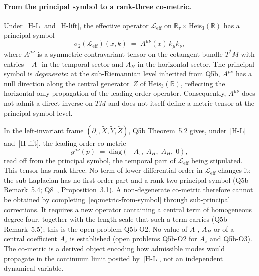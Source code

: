 \documentclass[11pt,a4paper]{article}
\begin{document}
    \paragraph{From the principal symbol to a rank-three co-metric.}
      \label{par:cometric-metric}
      Under~[H-L] and~[H-lift], the effective operator $\mathcal{L}_{\mathrm{eff}}$ on
      $\mathbb{R}_\tau \times \mathrm{Heis}_3(\mathbb{R})$ has a principal symbol
      \begin{equation}
        \label{eq:principal-symbol}
        \sigma_2(\mathcal{L}_{\mathrm{eff}})(x, k) \;=\; A^{\mu\nu}(x)\,k_\mu k_\nu,
      \end{equation}
      where $A^{\mu\nu}$ is a symmetric contravariant tensor on the cotangent bundle $T^*M$ with entries $-A_\tau$ in
      the temporal sector and $A_H$ in the horizontal sector.
      The principal symbol is \emph{degenerate}: at the sub-Riemannian level inherited from Q5b, $A^{\mu\nu}$ has a
      null direction along the central generator~$Z$ of $\mathrm{Heis}_3(\mathbb{R})$, reflecting the horizontal-only
      propagation of the leading-order operator.
      Consequently, $A^{\mu\nu}$ does not admit a direct inverse on $TM$ and does not itself define a metric tensor
      at the principal-symbol level.

      In the left-invariant frame $(\partial_\tau, \widetilde{X}, \widetilde{Y}, \widetilde{Z})$, Q5b Theorem~5.2
      gives, under~[H-L] and~[H-lift], the leading-order co-metric
      \begin{equation}
        \label{eq:metric-from-symbol}
        g^{\mu\nu}(p) \;=\; \mathrm{diag}(-A_\tau,\; A_H,\; A_H,\; 0),
      \end{equation}
      read off from the principal symbol, the temporal part of $\mathcal{L}_{\mathrm{eff}}$ being stipulated.
      This tensor has rank three.
      No term of lower differential order in $\mathcal{L}_{\mathrm{eff}}$ changes it: the sub-Laplacian has no
      first-order part and a rank-two principal symbol (Q5b Remark~5.4; Q8~\cite{BeauQ8}, Proposition~3.1).
      A non-degenerate co-metric therefore cannot be obtained by completing~\eqref{eq:metric-from-symbol} through
      sub-principal corrections.
      It requires a new operator containing a central term of homogeneous degree four, together with the length
      scale that such a term carries (Q5b Remark~5.5); this is the open problem Q5b-O2.
      No value of $A_\tau$, $A_H$ or of a central coefficient $A_z$ is established (open problems Q5b-O2 for $A_z$
      and Q5b-O3).
      The co-metric is a derived object encoding how admissible modes would propagate in the continuum limit posited
      by~[H-L], not an independent dynamical variable.
\end{document}
